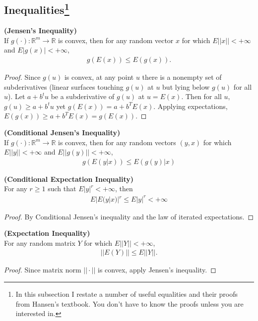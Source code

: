 \documentclass[11pt]{article} %
\theoremstyle{definition}
\numberwithin{defn}{subsection}
\numberwithin{thm}{subsection}
\numberwithin{ex}{subsection}
\newcommand{\bb}[1]{\mathbb{#1}}
\newcommand{\R}{\bb{R}}
\begin{document}
\subsection{Inequalities\footnote{In this subsection I restate a number of useful equalities and their proofs from Hansen's textbook. You don't have to know the proofs unless you are interested in.}}
\begin{thm}\label{thm:jensensineq}
	\textbf{(Jensen's Inequality)}\\
	If $g(\cdot):\R^m\rightarrow\R$ is convex, then for any random vector $x$ for which $E||x||<+\infty$ and $E|g(x)|<+\infty$,
	\begin{align*}
	g(E(x))\le E(g(x)).
	\end{align*}
	\begin{proof}
		Since $g(u)$ is convex, at any point $u$ there is a nonempty set of subderivatives (linear surfaces touching $g(u)$ at $u$ but lying below $g(u)$ for all $u$). Let $a+b^t u$ be a subderivative of $g(u)$ at $u=E(x)$. Then for all $u$, $g(u)\ge a+b^tu$ yet $g(E(x))=a+b^TE(x)$. Applying expectations, $E(g(x))\ge a+b^T E(x)=g(E(x))$.
	\end{proof}
\end{thm}

\begin{thm}\label{thm:conditionaljensensineq}
	\textbf{(Conditional Jensen's Inequality)}\\
	If $g(\cdot):\R^m\rightarrow\R$ is convex, then for any random vectors $(y,x)$ for which $E||y||<+\infty$ and $E||g(y)||<+\infty$,
	\begin{align*}
	g(E(y|x))\le E(g(y)|x)
	\end{align*}	
\end{thm}

\begin{thm}\label{thm:conditionalexpectationineq}
	\textbf{(Conditional Expectation Inequality)}\\
	For any $r\ge 1$ such that $E|y|^r<+\infty$, then
	\begin{align*}
	E|E(y|x)|^r\le E|y|^r <+\infty
	\end{align*}
	
	\begin{proof}
		By Conditional Jensen's inequality and the law of iterated expectations.
	\end{proof}	
\end{thm}

\begin{thm}\label{thm:expectationineq}
	\textbf{(Expectation Inequality)}\\
	For any random matrix $Y$ for which $E||Y||<+\infty$,
	\begin{align*}
	||E(Y)||\le E||Y||.
	\end{align*}
	\begin{proof}
		Since matrix norm $||\cdot||$ is convex, apply Jensen's inequality.
	\end{proof}
\end{thm}
\end{document}
